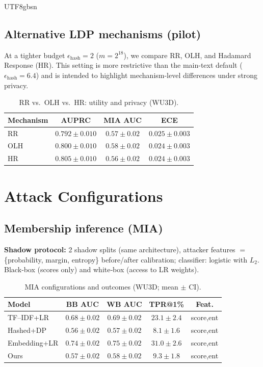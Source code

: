 \documentclass[acmsmall,natbib]{acmart}
\begin{document}
\begin{CJK*}{UTF8}{gbsn}
\subsection{Alternative LDP mechanisms (pilot)}
At a tighter budget $\epsilon_{\text{hash}}{=}2$ ($m{=}2^{18}$), we compare RR, OLH, and Hadamard Response (HR). This setting is more restrictive than the main-text default ($\epsilon_{\text{hash}}{=}6.4$) and is intended to highlight mechanism-level differences under strong privacy.

\begin{table}[h]
\centering
\caption{RR vs.\ OLH vs.\ HR: utility and privacy (WU3D).}
\label{tab:ldp-mechs}
\setlength{\tabcolsep}{6.0pt}
\begin{tabular}{lccc}
\toprule
\textbf{Mechanism} & \textbf{AUPRC} & \textbf{MIA AUC} & \textbf{ECE} \\
\midrule
RR & $0.792{\pm}0.010$ & $0.57{\pm}0.02$ & $0.025{\pm}0.003$ \\
OLH & $0.800{\pm}0.010$ & $0.58{\pm}0.02$ & $0.024{\pm}0.003$ \\
HR & $\mathbf{0.805}{\pm}0.010$ & $\mathbf{0.56}{\pm}0.02$ & $\mathbf{0.024}{\pm}0.003$ \\
\bottomrule
\end{tabular}
\end{table}


\section{Attack Configurations}
\label{app:attacks}

\subsection{Membership inference (MIA)}
\textbf{Shadow protocol:} 2 shadow splits (same architecture), attacker features $=$ \{probability, margin, entropy\} before/after calibration; classifier: logistic with $L_2$. Black‑box (scores only) and white‑box (access to LR weights).

\begin{table}[h]
\centering
\caption{MIA configurations and outcomes (WU3D; mean $\pm$ CI).}
\label{tab:mia-config}
\setlength{\tabcolsep}{3.8pt}
\begin{tabular}{lcccc}
\toprule
\textbf{Model} & \textbf{BB AUC} & \textbf{WB AUC} & \textbf{TPR@1\%} & \textbf{Feat.} \\
\midrule
TF–IDF+LR & $0.68{\pm}0.02$ & $0.69{\pm}0.02$ & $23.1{\pm}2.4$ & score,ent \\
Hashed+DP & $0.56{\pm}0.02$ & $0.57{\pm}0.02$ & $8.1{\pm}1.6$ & score,ent \\
Embedding+LR & $0.74{\pm}0.02$ & $0.75{\pm}0.02$ & $31.0{\pm}2.6$ & score,ent \\
Ours & $0.57{\pm}0.02$ & $0.58{\pm}0.02$ & $9.3{\pm}1.8$ & score,ent \\
\bottomrule
\end{tabular}
\end{table}


\end{CJK*}
\end{document}
